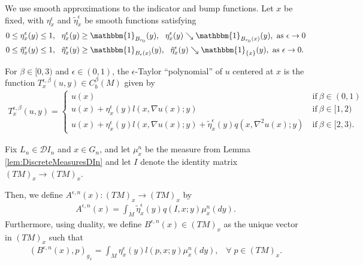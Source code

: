 \documentclass[11pt,reqno]{amsart}
\numberwithin{equation}{section}
\theoremstyle{plain}
\def\D{\mathcal D}
\def\Indicator{{\mathbbm{1}}}
\def\grad{\nabla}
\begin{document}
\begin{DEF}\label{def:EtaAndTildeEtaDef}
	We use smooth approximations to the indicator and bump functions.  Let $x$ be fixed, with $\eta^\epsilon_x$ and $\tilde\eta^\epsilon_x$ be smooth functions satisfying
	\begin{align*}
		& 0\leq \eta^\epsilon_x(y)\leq 1,\ \ \eta^\epsilon_x(y)\geq \Indicator_{B_{r_0}}(y),\ \ \eta^\epsilon_x(y)\searrow \Indicator_{B_{r_0}(x)}(y), \textnormal{ as }\epsilon \to 0
		\\
		& 0\leq \tilde\eta^\epsilon_x(y)\leq 1,\ \ \tilde\eta^\epsilon_x(y) \geq \Indicator_{B_{\epsilon}(x)}(y),\ \ \tilde\eta^\epsilon_x(y)\searrow \Indicator_{\{x\}}(y), \textnormal{ as }\epsilon \to 0.
	\end{align*}
\end{DEF}

\begin{DEF}\label{def:TaylorPolynomial}
	For $\beta\in[0,3)$ and $\epsilon\in(0,1)$, the $\epsilon$-Taylor ``polynomial'' of $u$ centered at $x$ is the function $T^{\epsilon,\beta}_x(u,y) \in C^\beta_b(M)$ given by
	\begin{align*}
		T^{\epsilon,\beta}_x(u,y) = 
		\begin{cases}
			u(x)\ &\text{if}\ \beta\in(0,1)\\
			u(x) + \eta^\epsilon_x(y)l(x,\grad u(x);y)\ &\text{if}\ \beta\in[1,2)\\
			u(x) + \eta^\epsilon_x(y) l(x,\grad u(x);y) + \tilde\eta^\epsilon_x(y) q(x,\nabla^2u(x);y)\ &\text{if}\ \beta \in [2,3).
		\end{cases}
	\end{align*}
\end{DEF}

\begin{DEF}\label{def:Adeln and Bdeln}
  Fix $L_n \in \D I_n$ and $x\in G_n$, and let $\mu^n_x$ be the measure from Lemma \ref{lem:DiscreteMeasuresDIn} and let $I$ denote the identity matrix $(TM)_x \to (TM)_x$.
  
  \noindent Then, we define $A^{\epsilon,n}(x):(TM)_x \to (TM)_x$ by
  \begin{align}\label{eqMMonM:Adeln}
    A^{\epsilon,n}(x) = \int_{M} \tilde \eta_x^{\epsilon}(y)q(I,x;y)\mu_x^n(dy).		    
  \end{align}	  
  Furthermore, using duality, we define $B^{\epsilon,n}(x) \in (TM)_x$ as the unique vector in $(TM)_x$ such that 
  \begin{align}\label{eqMMonM:Bdeln}	
    (B^{\epsilon,n}(x),p)_{g_x} = \int_{M} \eta_x^{\epsilon}(y)l(p,x;y)\mu_x^n(dy),\;\;\;\forall\;p\in (TM)_x.
  \end{align}	
	
\end{DEF}
 
\end{document}
